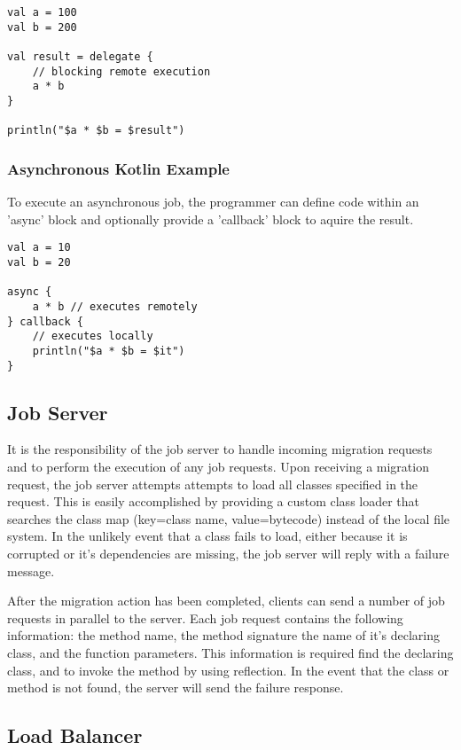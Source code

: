 \begin{lstlisting}
val a = 100
val b = 200

val result = delegate {
    // blocking remote execution
    a * b
}

println("$a * $b = $result")
\end{lstlisting}

\subsubsection{Asynchronous Kotlin Example}

To execute an asynchronous job, the programmer can define code within an
'async' block and optionally provide a 'callback' block to aquire the result.

\begin{lstlisting}
val a = 10
val b = 20

async {
    a * b // executes remotely
} callback {
    // executes locally
    println("$a * $b = $it")
}
\end{lstlisting}

\subsection{Job Server}\label{subsec:jobServer}

It is the responsibility of the job server to handle incoming
migration requests and to perform the execution of any job requests.
Upon receiving a migration request, the job server attempts attempts to
load all classes specified in the request.
This is easily accomplished by providing a custom class loader
that searches the class map (key=class name, value=bytecode) instead
of the local file system.
In the unlikely event that a class fails to load, either because it is corrupted or
it's dependencies are missing, the job server will reply with a failure message.

After the migration action has been completed, clients can send a number of job requests
in parallel to the server.
Each job request contains the following information: the method name, the method signature
the name of it's declaring class, and the function parameters.
This information is required find the declaring class, and to invoke the method
by using reflection.
In the event that the class or method is not found, the server will send the failure
response.


\subsection{Load Balancer}\label{subsec:modules}

